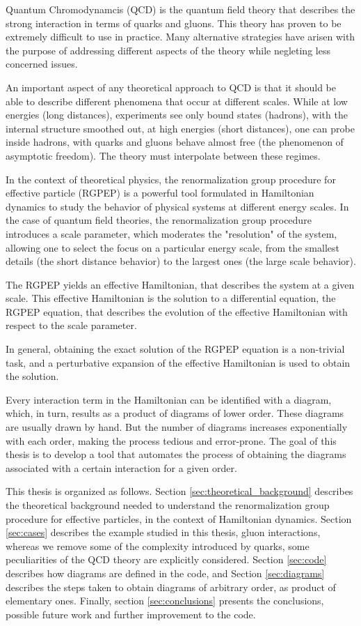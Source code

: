\documentclass[11pt,a4paper,twoside,pdf]{article}
\numberwithin{equation}{section}
\begin{document}
Quantum Chromodynamcis (QCD) is the quantum field theory that describes the strong interaction
in terms of quarks and gluons. This theory has proven to be extremely difficult to use in practice.
Many alternative strategies have arisen with the purpose of addressing different aspects
of the theory while negleting less concerned issues.

An important aspect of any theoretical approach to QCD is that it should be able to describe  
different phenomena that occur at different scales. While at low energies (long distances), experiments see only bound 
states (hadrons), with the internal structure smoothed out, at high energies 
(short distances), one can probe inside hadrons, with quarks and gluons behave almost free 
(the phenomenon of asymptotic freedom). The theory must interpolate between these regimes.

In the context of theoretical physics, the renormalization group procedure 
for effective particle (RGPEP) is a powerful tool formulated in Hamiltonian dynamics
 to study the behavior of physical systems 
at different energy scales\cite{PhysRevD.48.5863}. In the case of quantum field theories, 
the renormalization 
group procedure introduces a scale parameter, which moderates the "resolution" of the 
system, allowing one to select the focus on a particular energy scale, from 
the smallest details (the short distance behavior) to the largest ones (the large
scale behavior). 

The RGPEP yields an effective Hamiltonian, that describes the system at a
given scale. This effective Hamiltonian is the solution to a differential equation,
the RGPEP equation, that describes the evolution of the effective Hamiltonian with 
respect to the scale parameter.

In general, obtaining the exact solution of the RGPEP equation is a non-trivial task, 
and a perturbative expansion of the effective Hamiltonian is used to obtain the 
solution. 

Every interaction term in the Hamiltonian can be identified with a 
diagram, which, in turn, results as a product of diagrams of lower order.
These diagrams are usually drawn by hand. But the 
number of diagrams increases exponentially with each order, making the process 
tedious and error-prone. The goal of this thesis is to develop a tool that automates 
the process of obtaining the diagrams associated with a certain interaction for a 
given order.

This thesis is organized as follows. Section \ref{sec:theoretical_background} describes
the theoretical background needed to understand the renormalization group procedure
for effective particles, in the context of Hamiltonian dynamics. Section \ref{sec:cases}
describes the example studied in this thesis, gluon interactions, whereas we remove
some of the complexity introduced by quarks, some peculiarities of the QCD theory are 
explicitly considered. Section \ref{sec:code} describes how diagrams are defined in the code, 
and Section \ref{sec:diagrams} describes the steps taken to obtain diagrams of arbitrary order,
as product of elementary ones. Finally, 
section \ref{sec:conclusions} presents the conclusions, possible future work and 
further improvement to the code.
\end{document}
